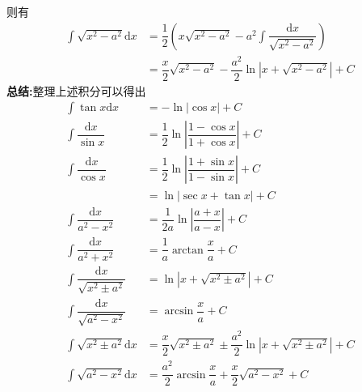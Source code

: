 \documentclass[a4paper,oneside]{ctexart}
\newcommand{\di}{\mathrm{d}}
\begin{document}
则有
$$\begin{aligned}
  \int{\sqrt{x^2-a^2}\di x} &= \dfrac{1}{2}\left( x\sqrt{x^2-a^2}-a^2\int{\dfrac{\di x}{\sqrt{x^2-a^2}}}\right) \\
                            &= \dfrac{x}{2}\sqrt{x^2-a^2}-\dfrac{a^2}{2}\ln\left\lvert x+\sqrt{x^2-a^2}\right\rvert+C
\end{aligned}$$
\textbf{总结:}整理上述积分可以得出
$$\begin{aligned}
  \int{\tan{x}\di x} &= -\ln{\left\lvert\cos{x}\right\rvert}+C \\
  \int{\dfrac{\di x}{\sin{x}}} &= \dfrac{1}{2}\ln\left\lvert\dfrac{1-\cos{x}}{1+\cos{x}}\right\rvert+C \\
  \int{\dfrac{\di x}{\cos{x}}} &= \dfrac{1}{2}\ln\left\lvert\dfrac{1+\sin{x}}{1-\sin{x}}\right\rvert+C \\
                               &= \ln\left\lvert\sec{x}+\tan{x}\right\rvert+C \\
  \int \dfrac{\di x}{a^2-x^2} &= \dfrac{1}{2a}\ln{\left\lvert\dfrac{a+x}{a-x}\right\rvert}+C \\
  \int \dfrac{\di x}{a^2+x^2} &= \dfrac{1}{a}\arctan{\dfrac{x}{a}}+C \\
  \int{\dfrac{\di x}{\sqrt{x^2\pm a^2}}} &= \ln{\left\lvert x+\sqrt{x^2\pm a^2}\right\rvert}+C \\
  \int{\dfrac{\di x}{\sqrt{a^2-x^2}}} &= \arcsin{\dfrac{x}{a}}+C \\
  \int{\sqrt{x^2\pm a^2}\di x} &= \dfrac{x}{2}\sqrt{x^2\pm a^2}\pm\dfrac{a^2}{2}\ln\left\lvert x+\sqrt{x^2\pm a^2}\right\rvert+C \\
  \int{\sqrt{a^2-x^2}\di x} &= \dfrac{a^2}{2}\arcsin{\dfrac{x}{a}}+\dfrac{x}{2}\sqrt{a^2-x^2}+C
\end{aligned}$$
\end{document}
